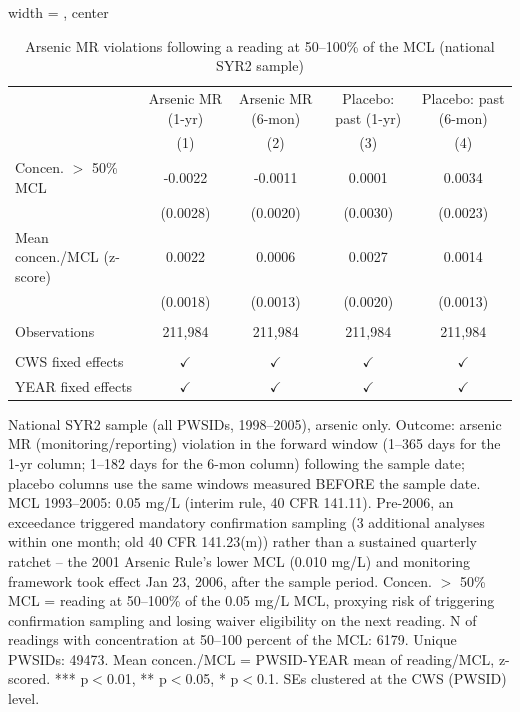
\begin{table}[htbp]
\caption{Arsenic MR violations following a reading at 50--100\% of the MCL (national SYR2 sample)}\label{tab:mr_concentration_lag_national_arsenic}
\centering
\begin{adjustbox}{width = \textwidth, center}
   \begin{tabular}{lcccc}
      \toprule    
                          & Arsenic MR (1-yr) & Arsenic MR (6-mon)  & Placebo: past (1-yr) & Placebo: past (6-mon) \\   
                          & (1)               & (2)                 & (3)                  & (4)\\  
      \midrule 
      Concen. $>$ 50\% MCL           & -0.0022           & -0.0011             & 0.0001               & 0.0034\\   
                          & (0.0028)          & (0.0020)            & (0.0030)             & (0.0023)\\   
      Mean concen./MCL (z-score)      & 0.0022            & 0.0006              & 0.0027               & 0.0014\\   
                          & (0.0018)          & (0.0013)            & (0.0020)             & (0.0013)\\   
       \\
      Observations        & 211,984           & 211,984             & 211,984              & 211,984\\  
       \\
      CWS fixed effects & $\checkmark$      & $\checkmark$        & $\checkmark$         & $\checkmark$\\   
      YEAR fixed effects  & $\checkmark$      & $\checkmark$        & $\checkmark$         & $\checkmark$\\   
      \bottomrule
   \end{tabular}
\end{adjustbox}
{\tiny\linespread{1}\selectfont \par \raggedright National SYR2 sample (all PWSIDs, 1998--2005), arsenic only. Outcome: arsenic MR (monitoring/reporting) violation in the forward window (1--365 days for the 1-yr column; 1--182 days for the 6-mon column) following the sample date; placebo columns use the same windows measured BEFORE the sample date. MCL 1993--2005: 0.05 mg/L (interim rule, 40 CFR 141.11). Pre-2006, an exceedance triggered mandatory confirmation sampling (3 additional analyses within one month; old 40 CFR 141.23(m)) rather than a sustained quarterly ratchet -- the 2001 Arsenic Rule's lower MCL (0.010 mg/L) and monitoring framework took effect Jan 23, 2006, after the sample period. Concen. $>$ 50\% MCL = reading at 50--100\% of the 0.05 mg/L MCL, proxying risk of triggering confirmation sampling and losing waiver eligibility on the next reading. N of readings with concentration at 50--100 percent of the MCL: 6179. Unique PWSIDs: 49473. Mean concen./MCL = PWSID-YEAR mean of reading/MCL, z-scored. *** p$<$0.01, ** p$<$0.05, * p$<$0.1. SEs clustered at the CWS (PWSID) level.}
\end{table}
